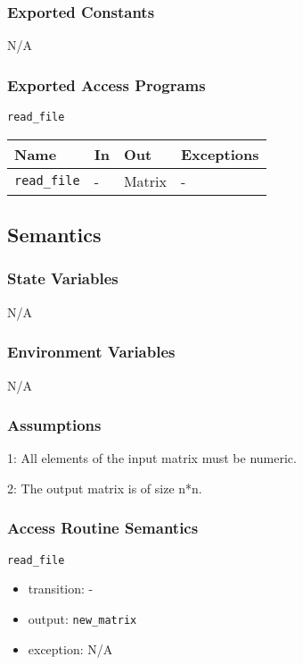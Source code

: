 \documentclass[12pt, titlepage]{article}
\begin{document}
\subsubsection{Exported Constants}
N/A
\subsubsection{Exported Access Programs}
\texttt{read\_file}
\begin{center}
\begin{tabular}{p{2cm} p{4cm} p{4cm} p{2cm}}
\hline
\textbf{Name} & \textbf{In} & \textbf{Out} & \textbf{Exceptions} \\
\hline
\texttt{read\_file} & - & Matrix & - \\
\hline
\end{tabular}
\end{center}

\subsection{Semantics}

\subsubsection{State Variables}

N/A

\subsubsection{Environment Variables}

N/A

\subsubsection{Assumptions}

\begin{description}
\item 1: All elements of the input matrix must be numeric.
\item 2: The output matrix is of size n*n.
\end{description}

\subsubsection{Access Routine Semantics}

\noindent \texttt{read\_file}
\begin{itemize}
\item transition: - 
\item output: \texttt{new\_matrix}
\item exception: N/A  
\end{itemize}
\end{document}
